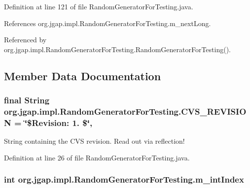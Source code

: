 Definition at line 121 of file Random\-Generator\-For\-Testing.\-java.



References org.\-jgap.\-impl.\-Random\-Generator\-For\-Testing.\-m\-\_\-next\-Long.



Referenced by org.\-jgap.\-impl.\-Random\-Generator\-For\-Testing.\-Random\-Generator\-For\-Testing().



\subsection{Member Data Documentation}
\hypertarget{classorg_1_1jgap_1_1impl_1_1_random_generator_for_testing_a87fb6bde08b6325c072ef3bbee30cd82}{
\subsubsection[{C\-V\-S\-\_\-\-R\-E\-V\-I\-S\-I\-O\-N}]{\setlength{\rightskip}{0pt plus 5cm}final String org.\-jgap.\-impl.\-Random\-Generator\-For\-Testing.\-C\-V\-S\-\_\-\-R\-E\-V\-I\-S\-I\-O\-N = \char`\"{}\$Revision\-: 1. \$\char`\"{}\hspace{0.3cm}{\ttfamily [static]}, {\ttfamily [private]}}}\label{classorg_1_1jgap_1_1impl_1_1_random_generator_for_testing_a87fb6bde08b6325c072ef3bbee30cd82}
String containing the C\-V\-S revision. Read out via reflection! 

Definition at line 26 of file Random\-Generator\-For\-Testing.\-java.

\hypertarget{classorg_1_1jgap_1_1impl_1_1_random_generator_for_testing_a292525e2e439fecda21a97f392ea4294}{
\subsubsection[{m\-\_\-int\-Index}]{\setlength{\rightskip}{0pt plus 5cm}int org.\-jgap.\-impl.\-Random\-Generator\-For\-Testing.\-m\-\_\-int\-Index\hspace{0.3cm}{\ttfamily [private]}}}\label{classorg_1_1jgap_1_1impl_1_1_random_generator_for_testing_a292525e2e439fecda21a97f392ea4294}


